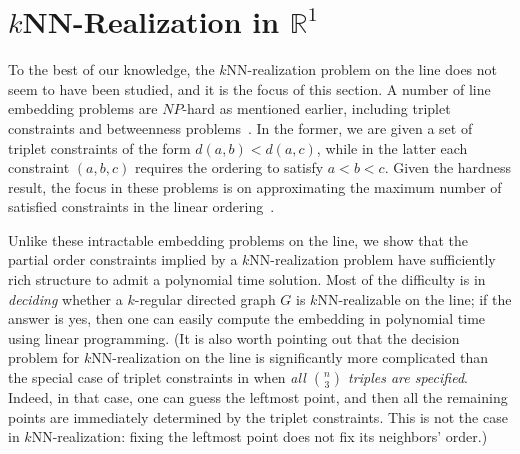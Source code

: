 \documentclass[english]{lipics-v2021}
\begin{document}
\newcommand{\coeff}[1]{C_{#1}}
\newcommand{\partcoeff}[2]{C_{#2}^{#1}}
\newcommand{\yleft}{y^-}
\newcommand{\yright}{y^+}

\section{\texorpdfstring{$k$}{k}NN-Realization in \texorpdfstring{$\mathbb{R}^1$}{R1}} \label{sec-1D}

To the best of our knowledge, the $k$NN-realization problem on the line does not seem to have been studied, and it is the focus of this section. A number of line embedding problems are $NP$-hard as mentioned earlier, including triplet constraints and betweenness problems~\cite{ChorSudan}. In the former, we are given a set of triplet constraints of the form $d(a,b) < d(a,c)$, while in the latter each constraint $(a,b,c)$ requires the ordering to satisfy $a < b < c$. Given the hardness result, the focus in these problems is on approximating the maximum number of satisfied constraints in the linear ordering~\cite{fan2020}. 

Unlike these intractable embedding problems on the line, we show that the partial order constraints implied by a $k$NN-realization problem have sufficiently  rich structure to admit a polynomial time solution. Most of the difficulty is in \emph{deciding} whether a $k$-regular directed graph $G$ is $k$NN-realizable on the line; if the answer is yes, then one can easily compute the embedding in polynomial time using linear programming.
(It is also worth pointing out that the decision problem for $k$NN-realization on the line is significantly more complicated than the special case of triplet constraints in \cite{fan2020} when \emph{all $\binom{n}{3}$ triples are specified}. Indeed, in that case, one can guess the leftmost point, and then all the remaining points are immediately determined by the triplet constraints. This is not the case in $k$NN-realization: fixing the leftmost point does not fix its neighbors' order.) 
\end{document}
